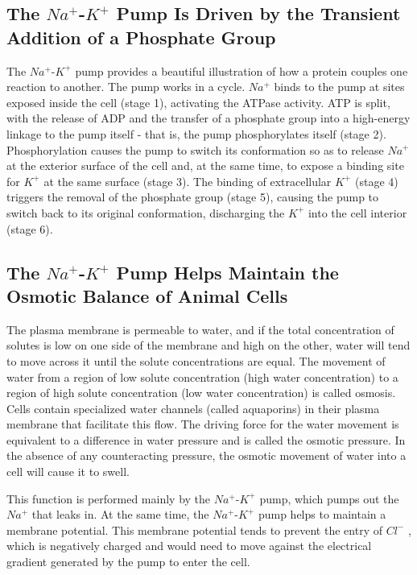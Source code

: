\subsection{The $Na^{+}$-$K^{+}$ Pump Is Driven by the Transient Addition of a Phosphate Group}

The $Na^{+}$-$K^{+}$ pump provides a beautiful illustration of how a protein
couples one reaction to another. The pump works in a cycle.
$Na^{+}$ binds to the pump at sites exposed inside the cell (stage 1),
activating the ATPase activity. ATP is split, with the release of ADP and
the transfer of a phosphate group into a high-energy linkage to the pump
itself - that is, the pump phosphorylates itself (stage 2). Phosphorylation
causes the pump to switch its conformation so as to release $Na^{+}$ at the
exterior surface of the cell and, at the same time, to expose a binding
site for $K^{+}$ at the same surface (stage 3). The binding of extracellular $K^{+}$
(stage 4) triggers the removal of the phosphate group (stage 5), causing
the pump to switch back to its original conformation, discharging the $K^{+}$
into the cell interior (stage 6).

\subsection{The $Na^{+}$-$K^{+}$ Pump Helps Maintain the Osmotic Balance of Animal Cells}

The plasma membrane is permeable to water, and if
the total concentration of solutes is low on one side of the membrane
and high on the other, water will tend to move across it until the solute
concentrations are equal. The movement of water from a region of low
solute concentration (high water concentration) to a region of high solute
concentration (low water concentration) is called osmosis. Cells contain
specialized water channels (called aquaporins) in their plasma membrane
that facilitate this flow. The driving force for the water movement
is equivalent to a difference in water pressure and is called the osmotic
pressure. In the absence of any counteracting pressure, the osmotic
movement of water into a cell will cause it to swell.

This function is performed mainly by the $Na^{+}$-$K^{+}$ pump, which pumps
out the $Na^{+}$ that leaks in. At the same time, the $Na^{+}$-$K^{+}$ pump helps to
maintain a membrane potential. This membrane
potential tends to prevent the entry of $Cl^{-}$ , which is negatively charged
and would need to move against the electrical gradient generated by the
pump to enter the cell.

